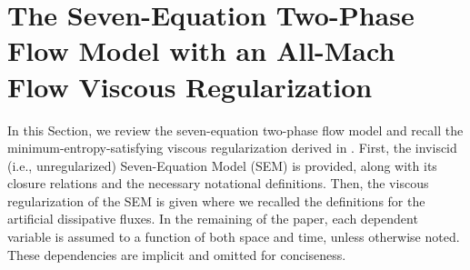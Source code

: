 \documentclass[preprint,10pt]{elsarticle}
\begin{document}
\section{The Seven-Equation Two-Phase Flow Model with an All-Mach Flow Viscous Regularization}\label{sec:7-equ-model}
%
In this Section, we review the seven-equation two-phase flow model \cite{Berry_NED2010} and recall the minimum-entropy-satisfying viscous 
regularization derived  in \cite{Marco_paper_sem}.  
First, the inviscid (i.e., unregularized) Seven-Equation Model (SEM) is provided, along with its closure relations and the necessary 
notational definitions. 
Then, the viscous regularization of the SEM is given where we recalled the definitions for the artificial dissipative fluxes.
In the remaining of the paper, each dependent variable is assumed to a function of both space and time, unless otherwise noted. 
These dependencies are implicit and omitted for conciseness. 
%
\end{document}
